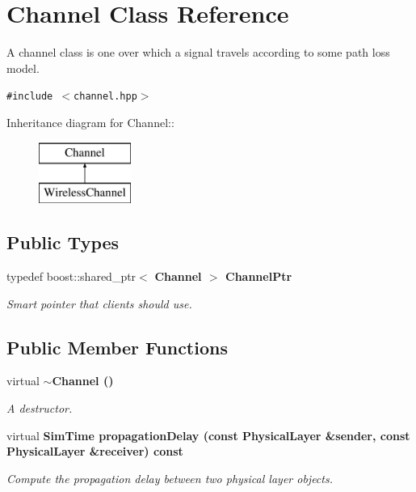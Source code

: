 \section{Channel Class Reference}
\label{classChannel}
A channel class is one over which a signal travels according to some path loss model.  


{\tt \#include $<$channel.hpp$>$}

Inheritance diagram for Channel::\begin{figure}[H]
\begin{center}
\leavevmode
\includegraphics[height=2cm]{classChannel}
\end{center}
\end{figure}
\subsection*{Public Types}
\begin{CompactItemize}
\item 
typedef boost::shared\_\-ptr$<$ \bf{Channel} $>$ \bf{Channel\-Ptr}\label{classChannel_c81a065919781b21f07ce3ac6e354675}

\begin{CompactList}\small\item\em Smart pointer that clients should use. \item\end{CompactList}\end{CompactItemize}
\subsection*{Public Member Functions}
\begin{CompactItemize}
\item 
virtual \bf{$\sim$Channel} ()\label{classChannel_5f15ebd302464069f1a9e3f0ded14482}

\begin{CompactList}\small\item\em A destructor. \item\end{CompactList}\item 
virtual \bf{Sim\-Time} \bf{propagation\-Delay} (const \bf{Physical\-Layer} \&sender, const \bf{Physical\-Layer} \&receiver) const 
\begin{CompactList}\small\item\em Compute the propagation delay between two physical layer objects. \item\end{CompactList}\end{CompactItemize}
